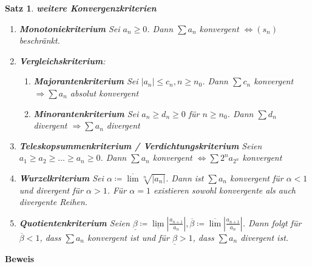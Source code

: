 \documentclass[ngerman,titlepage,twoside, parskip=half*]{scrreprt}
\theoremstyle{plain}
\newtheorem{theorem}{Satz}[section]
\theoremstyle{definition}
\theoremstyle{remark}
\begin{document}
\begin{theorem}
\label{satz:wkonvkrit}
\textbf{weitere Konvergenzkriterien}
\begin{enumerate}[(1)]
  \item \textbf{Monotoniekriterium} Sei $a_n\geq 0$. Dann $\sum a_n$ konvergent $\Leftrightarrow
    (s_n)$ beschränkt.
  \item \textbf{Vergleichskriterium}:
  \begin{enumerate}[({2}.1)]
    \item \textbf{Majorantenkriterium} Sei $|a_n|\leq c_n, n\geq n_0$. Dann $\sum c_n$ konvergent
      $\Rightarrow \sum a_n$ absolut konvergent
    \item \textbf{Minorantenkriterium} Sei $a_n\geq d_n\geq 0$ für $n\geq n_0$. Dann $\sum d_n$
      divergent $\Rightarrow \sum a_n$ divergent
  \end{enumerate}
  \item \textbf{Teleskopsummenkriterium / Verdichtungskriterium} 
    Seien $a_1\geq a_2\geq \ldots \geq a_n\geq 0$. Dann $\sum a_n$ konvergent $\Leftrightarrow \sum 2^n a_{2^n}$ konvergent
  \item \textbf{Wurzelkriterium} Sei $\alpha \coloneqq\overline{\lim}\sqrt[n]{|a_n|}$. Dann ist $\sum a_n$
    konvergent für $\alpha <1$ und divergent für $\alpha >1$. Für $\alpha=1$ existieren sowohl konvergente als auch
    divergente Reihen.
  \item \textbf{Quotientenkriterium} Seien $\underline{\beta}\coloneqq\underline{\lim}|\frac{a_{n+1}}{a_n}|,
    \overline{\beta}\coloneqq\overline{\lim}|\frac{a_{n+1}}{a_n}|$. Dann folgt für $\overline{\beta}<1$, dass $\sum a_n$
    konvergent ist und für $\underline{\beta}>1$, dass $\sum a_n$ divergent ist.
\end{enumerate}
\end{theorem}
\textbf{Beweis}
\end{document}
